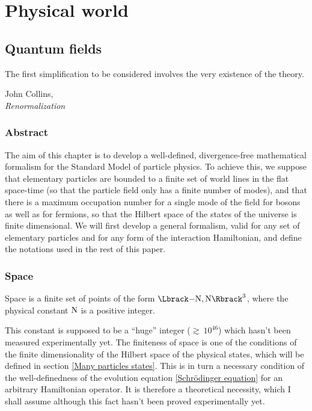 \documentclass[10pt,a4paper,twoside,openany]{book}
\begin{document}
\mainmatter

\part{Physical world}

\chapter{Quantum fields}
\label{Quantum fields}

\renewcommand{\epigraphwidth}{7cm}
\epigraph{The first simplification to be considered involves the very existence of the theory.}{John Collins,\\\textit{Renormalization}~\cite{Collins1984}}

\section{Abstract}

The aim of this chapter is to develop a well-defined, divergence-free mathematical formalism for the Standard Model of particle physics. To achieve this, we suppose that elementary particles are bounded to a finite set of world lines in the flat space-time (so that the particle field only has a finite number of modes), and that there is a maximum occupation number for a single mode of the field for bosons as well as for fermions, so that the Hilbert space of the states of the universe is finite dimensional. We will first develop a general formalism, valid for any set of elementary particles and for any form of the interaction Hamiltonian, and define the notations used in the rest of this paper.

\section{Space}

 Space is a finite set of points of the form $\FL$, where the physical constant $\mathrm N$ is a positive integer.

 This constant is supposed to be a ``huge'' integer ($\gtrsim~10^{46}$) which hasn't been measured experimentally yet. The finiteness of space is one of the conditions of the finite dimensionality of the Hilbert space of the physical states, which will be defined in section \ref{Many particles states}. This is in turn a necessary condition of the well-definedness of the evolution equation \ref{Schrödinger equation} for an arbitrary Hamiltonian operator. It is therefore a theoretical necessity, which I shall assume although this fact hasn't been proved experimentally yet.
\end{document}
